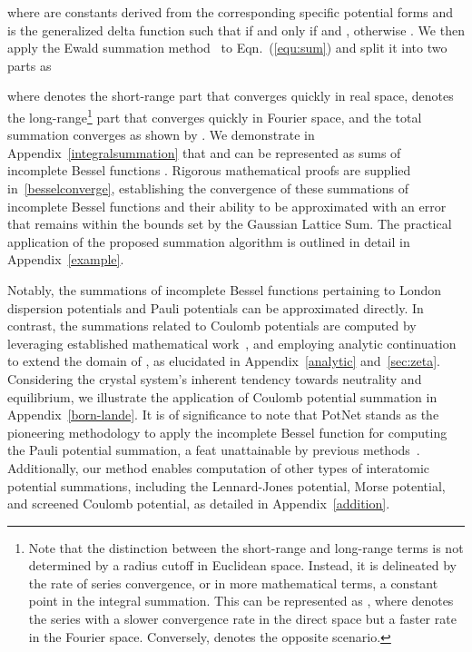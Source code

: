 \documentclass[nohyperref]{article}
\theoremstyle{plain}
\theoremstyle{definition}
\theoremstyle{remark}
\begin{document}
where  are constants derived from the corresponding specific potential forms and  is the generalized delta function such that  if and only if  and , otherwise . We then apply the Ewald summation method~\citep{ewald} to Eqn.~(\ref{equ:sum}) and split it into two parts as

where  denotes the short-range part that converges quickly in real space,  denotes the long-range\footnote{Note that the distinction between the short-range and long-range terms is not determined by a radius cutoff in Euclidean space. Instead, it is delineated by the rate of series convergence, or in more mathematical terms, a constant point in the integral summation. This can be represented as , where  denotes the series with a slower convergence rate in the direct space but a faster rate in the Fourier space. Conversely,  denotes the opposite scenario.} part that converges quickly in Fourier space, and the total summation converges as shown by \citet{ewald}. We demonstrate in Appendix~\ref{integralsummation} that  and  can be represented as sums of incomplete Bessel functions . Rigorous mathematical proofs are supplied in~\ref{besselconverge}, establishing the convergence of these summations of incomplete Bessel functions and their ability to be approximated with an error that remains within the bounds set by the Gaussian Lattice Sum. The practical application of the proposed summation algorithm is outlined in detail in Appendix~\ref{example}. 

Notably, the summations of incomplete Bessel functions pertaining to London dispersion potentials and Pauli potentials can be approximated directly. In contrast, the summations related to Coulomb potentials are computed by leveraging established mathematical work~\citep{terras1973bessel,kirsten1994generalized}, and employing analytic continuation to extend the domain of , as elucidated in Appendix~\ref{analytic} and~\ref{sec:zeta}. Considering the crystal system's inherent tendency towards neutrality and equilibrium, we illustrate the application of Coulomb potential summation in Appendix~\ref{born-lande}. It is of significance to note that PotNet stands as the pioneering methodology to apply the incomplete Bessel function for computing the Pauli potential summation, a feat unattainable by previous methods~\citep{epstein, lee2009ewald, fft}. Additionally, our method enables computation of other types of interatomic potential summations, including the Lennard-Jones potential, Morse potential, and screened Coulomb potential, as detailed in Appendix~\ref{addition}.
\end{document}
